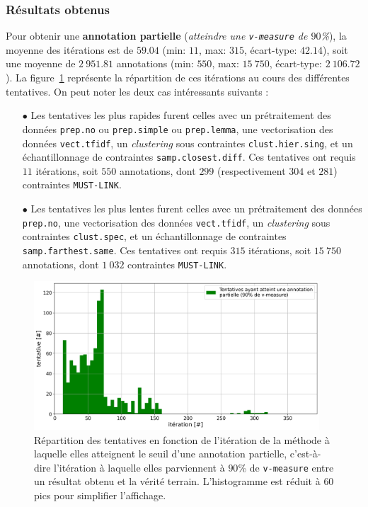 		\subsubsection{Résultats obtenus}
		
			Pour obtenir une \textbf{annotation partielle} (\textit{atteindre une \texttt{v-measure} de $90$\%}), la moyenne des itérations est de $59.04$ (min: $11$, max: $315$, écart-type: $42.14$), soit une moyenne de $2~951.81$ annotations (min: $550$, max: $15~750$, écart-type: $2~106.72$).
			La figure~\ref{figure:4.2.1-ETUDE-OPTIMISATION-HISTOGRAMME-ANNOTATION-PARTIELLE} représente la répartition de ces itérations au cours des différentes tentatives.
			On peut noter les deux cas intéressants suivants :
			\begin{itemize}
				\item[$\bullet$] Les tentatives les plus rapides furent celles avec un prétraitement des données \texttt{prep.no} ou \texttt{prep.simple} ou \texttt{prep.lemma}, une vectorisation des données \texttt{vect.tfidf}, un \textit{clustering} sous contraintes \texttt{clust.hier.sing}, et un échantillonnage de contraintes \texttt{samp.closest.diff}. Ces tentatives ont requis $11$ itérations, soit $550$ annotations, dont $299$ (respectivement $304$ et $281$) contraintes \texttt{MUST-LINK}.
				\item[$\bullet$] Les tentatives les plus lentes furent celles avec un prétraitement des données \texttt{prep.no}, une vectorisation des données \texttt{vect.tfidf}, un \textit{clustering} sous contraintes \texttt{clust.spec}, et un échantillonnage de contraintes \texttt{samp.farthest.same}. Ces tentatives ont requis $315$ itérations, soit $15~750$ annotations, dont $1~032$ contraintes \texttt{MUST-LINK}.
			\end{itemize}
			\begin{figure}[!htb]
				\centering
				\includegraphics[width=0.95\textwidth]{figures/etude-efficience-histogramme-annotation-partielle}
				\caption{Répartition des tentatives en fonction de l'itération de la méthode à laquelle elles atteignent le seuil d'une annotation partielle, c'est-à-dire l'itération à laquelle elles parviennent à $90$\% de \texttt{v-measure} entre un résultat obtenu et la vérité terrain. L'histogramme est réduit à $60$ pics pour simplifier l'affichage.}
				\label{figure:4.2.1-ETUDE-OPTIMISATION-HISTOGRAMME-ANNOTATION-PARTIELLE}
			\end{figure}
